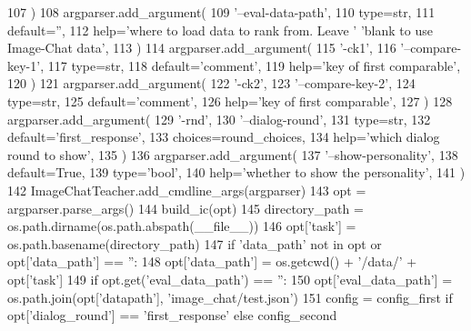 \begin{DoxyCode}
107     )
108     argparser.add\_argument(
109         \textcolor{stringliteral}{'--eval-data-path'},
110         type=str,
111         default=\textcolor{stringliteral}{''},
112         help=\textcolor{stringliteral}{'where to load data to rank from. Leave '} \textcolor{stringliteral}{'blank to use Image-Chat data'},
113     )
114     argparser.add\_argument(
115         \textcolor{stringliteral}{'-ck1'},
116         \textcolor{stringliteral}{'--compare-key-1'},
117         type=str,
118         default=\textcolor{stringliteral}{'comment'},
119         help=\textcolor{stringliteral}{'key of first comparable'},
120     )
121     argparser.add\_argument(
122         \textcolor{stringliteral}{'-ck2'},
123         \textcolor{stringliteral}{'--compare-key-2'},
124         type=str,
125         default=\textcolor{stringliteral}{'comment'},
126         help=\textcolor{stringliteral}{'key of first comparable'},
127     )
128     argparser.add\_argument(
129         \textcolor{stringliteral}{'-rnd'},
130         \textcolor{stringliteral}{'--dialog-round'},
131         type=str,
132         default=\textcolor{stringliteral}{'first\_response'},
133         choices=round\_choices,
134         help=\textcolor{stringliteral}{'which dialog round to show'},
135     )
136     argparser.add\_argument(
137         \textcolor{stringliteral}{'--show-personality'},
138         default=\textcolor{keyword}{True},
139         type=\textcolor{stringliteral}{'bool'},
140         help=\textcolor{stringliteral}{'whether to show the personality'},
141     )
142     ImageChatTeacher.add\_cmdline\_args(argparser)
143     opt = argparser.parse\_args()
144     build\_ic(opt)
145     directory\_path = os.path.dirname(os.path.abspath(\_\_file\_\_))
146     opt[\textcolor{stringliteral}{'task'}] = os.path.basename(directory\_path)
147     \textcolor{keywordflow}{if} \textcolor{stringliteral}{'data\_path'} \textcolor{keywordflow}{not} \textcolor{keywordflow}{in} opt \textcolor{keywordflow}{or} opt[\textcolor{stringliteral}{'data\_path'}] == \textcolor{stringliteral}{''}:
148         opt[\textcolor{stringliteral}{'data\_path'}] = os.getcwd() + \textcolor{stringliteral}{'/data/'} + opt[\textcolor{stringliteral}{'task'}]
149     \textcolor{keywordflow}{if} opt.get(\textcolor{stringliteral}{'eval\_data\_path'}) == \textcolor{stringliteral}{''}:
150         opt[\textcolor{stringliteral}{'eval\_data\_path'}] = os.path.join(opt[\textcolor{stringliteral}{'datapath'}], \textcolor{stringliteral}{'image\_chat/test.json'})
151     config = config\_first \textcolor{keywordflow}{if} opt[\textcolor{stringliteral}{'dialog\_round'}] == \textcolor{stringliteral}{'first\_response'} \textcolor{keywordflow}{else} config\_second

\end{DoxyCode}
